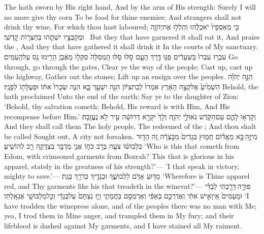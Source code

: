 {The \lord\space hath sworn by His right hand, And by the arm of His strength: Surely I will no more give thy corn To be food for thine enemies; And strangers shall not drink thy wine, For which thou hast laboured;}
{כִּ֤י מְאַסְפָיו֙ יֹאכְלֻ֔הוּ וְהִֽלְל֖וּ אֶת\maqqaf יְהֹוָ֑ה וּמְקַבְּצָ֥יו יִשְׁתֻּ֖הוּ בְּחַצְר֥וֹת קׇדְשִֽׁי׃ \setuma }
{But they that have garnered it shall eat it, And praise the \lord, And they that have gathered it shall drink it In the courts of My sanctuary.}
{עִבְר֤וּ עִבְרוּ֙ בַּשְּׁעָרִ֔ים פַּנּ֖וּ דֶּ֣רֶךְ הָעָ֑ם סֹ֣לּוּ סֹ֤לּוּ הַֽמְסִלָּה֙ סַקְּל֣וּ מֵאֶ֔בֶן הָרִ֥ימוּ נֵ֖ס עַל\maqqaf הָֽעַמִּֽים׃}
{Go through, go through the gates, Clear ye the way of the people; Cast up, cast up the highway, Gather out the stones; Lift up an ensign over the peoples.}
{הִנֵּ֣ה יְהֹוָ֗ה הִשְׁמִ֙יעַ֙ אֶל\maqqaf קְצֵ֣ה הָאָ֔רֶץ אִמְרוּ֙ לְבַת\maqqaf צִיּ֔וֹן הִנֵּ֥ה יִשְׁעֵ֖ךְ בָּ֑א הִנֵּ֤ה שְׂכָרוֹ֙ אִתּ֔וֹ וּפְעֻלָּת֖וֹ לְפָנָֽיו׃}
{Behold, the \lord\space hath proclaimed Unto the end of the earth: Say ye to the daughter of Zion: ‘Behold, thy salvation cometh; Behold, His reward is with Him, And His recompense before Him.’}
{וְקָרְא֥וּ לָהֶ֛ם עַם\maqqaf הַקֹּ֖דֶשׁ גְּאוּלֵ֣י יְהֹוָ֑ה וְלָךְ֙ יִקָּרֵ֣א דְרוּשָׁ֔ה עִ֖יר לֹ֥א נֶעֱזָֽבָה׃ \setuma }
{And they shall call them The holy people, The redeemed of the \lord; And thou shalt be called Sought out, A city not forsaken.}
\newperek
{}
{מִי\maqqaf זֶ֣ה \legarmeh  בָּ֣א מֵאֱד֗וֹם חֲמ֤וּץ בְּגָדִים֙ מִבׇּצְרָ֔ה זֶ֚ה הָד֣וּר בִּלְבוּשׁ֔וֹ צֹעֶ֖ה בְּרֹ֣ב כֹּח֑וֹ אֲנִ֛י מְדַבֵּ֥ר בִּצְדָקָ֖ה רַ֥ב לְהוֹשִֽׁיעַ׃}
{‘Who is this that cometh from Edom, with crimsoned garments from Bozrah? This that is glorious in his apparel, stately in the greatness of his strength?’— ’I that speak in victory, mighty to save.’—}
{מַדּ֥וּעַ אָדֹ֖ם לִלְבוּשֶׁ֑ךָ וּבְגָדֶ֖יךָ כְּדֹרֵ֥ךְ בְּגַֽת׃}
{‘Wherefore is Thine apparel red, and Thy garments like his that treadeth in the winevat?’—}
{פּוּרָ֣ה \legarmeh  דָּרַ֣כְתִּי לְבַדִּ֗י וּמֵֽעַמִּים֙ אֵֽין\maqqaf אִ֣ישׁ אִתִּ֔י וְאֶדְרְכֵ֣ם בְּאַפִּ֔י וְאֶרְמְסֵ֖ם בַּחֲמָתִ֑י וְיֵ֤ז נִצְחָם֙ עַל\maqqaf בְּגָדַ֔י וְכׇל\maqqaf מַלְבּוּשַׁ֖י אֶגְאָֽלְתִּי׃}
{‘I have trodden the winepress alone, and of the peoples there was no man with Me; yea, I trod them in Mine anger, and trampled them in My fury; and their lifeblood is dashed against My garments, and I have stained all My raiment.}
